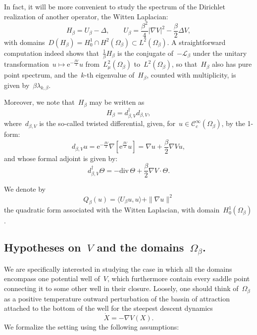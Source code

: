 \documentclass[10pt]{article}
\newcommand{\cL}{\mathcal{L}}
\newcommand{\e}{\mathrm{e}}
\renewcommand{\div}{\mathrm{div}}
\newcommand{\1}{\mathbbm 1}
\begin{document}
    In fact, it will be more convenient to study the spectrum of the Dirichlet realization of another operator, the Witten Laplacian:
    \begin{equation}
        \label{eq:witten_laplacian}
        H_{\beta} = U_\beta - \Delta,\qquad U_\beta = \frac{\beta^2}4|\nabla V|^2 - \frac{\beta}2 \Delta V,
    \end{equation}
    with domains~$D(H_\beta)=H_0^1\cap H^2(\Omega_\beta) \subset L^2(\Omega_\beta)$. A straightforward computation indeed shows that~$\frac1{\beta}H_\beta$ is the conjugate of~$-\cL_\beta$ under the unitary transformation~$u\mapsto \e^{-\frac{\beta V}2}u$ from~$L_\mu^2(\Omega_\beta)$ to~$L^2(\Omega_\beta)$, so that~$H_\beta$ also has pure point spectrum, and the~$k$-th eigenvalue of~$H_\beta$, counted with multiplicity, is given by~$\beta\lambda_{k,\beta}$.

    Moreover, we note that~$H_\beta$ may be written as
    \begin{equation}
        \label{eq:factorization_witten}
        H_\beta = d_{\beta,V}^\dagger d_{\beta,V},
    \end{equation}
    where~$d_{\beta,V}$ is the so-called twisted differential, given, for~$u\in \mathcal C_c^\infty(\Omega_\beta)$, by the 1-form:
    \begin{equation}
        \label{eq:twisted_differential}
        d_{\beta,V}u = \e^{-\frac{\beta V}2}\nabla\left[\e^{\frac{\beta V}2}u\right] = \nabla u + \frac\beta 2\nabla V u,
    \end{equation}
    and whose formal adjoint is given by:
    \begin{equation}
        \label{eq:twisted_differential_adjoint}
        d_{\beta,V}^\dagger \Theta = -\div\, \Theta +\frac\beta 2 \nabla V \cdot \Theta.
    \end{equation}

    We denote by
    \begin{equation}
        \label{eq:witten_quad_form}
        Q_\beta(u) = \langle U_\beta u ,u \rangle + \|\nabla u\|^2
    \end{equation}
    the quadratic form associated with the Witten Laplacian, with domain~$H_0^1(\Omega_\beta)$.

    \subsection{Hypotheses on~$V$ and the domains~$\Omega_\beta$.\newline}
    We are specifically interested in studying the case in which all the domains encompass one potential well of~$V$, which furthermore contain every saddle point connecting it to some other well in their closure.
    Loosely, one should think of~$\Omega_\beta$ as a positive temperature outward perturbation of the bassin of attraction attached to the bottom of the well for the steepest descent dynamics
    \begin{equation}
        \label{eq:gradient_flow}
        \dot X = -\nabla V(X).
    \end{equation}
    We formalize the setting using the following assumptions:
\end{document}
